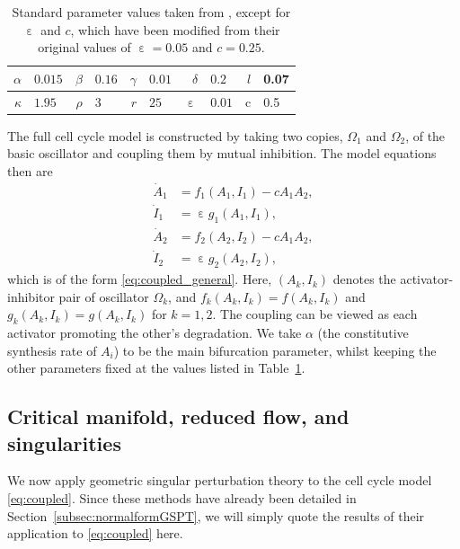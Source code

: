 \documentclass[10pt,onecolumn]{article}
\theoremstyle{plain}
\DeclareMathOperator{\eps}{\varepsilon}
\begin{document}
\begin{table}[h]
   \centering
   \begin{tabular}{|r|l|r|l|r|l|r|l|r|l|} 
   \hline
   $\alpha$ & $0.015$ & $\beta$ & $0.16$ & $\gamma$ & $0.01$ & $\delta$ & $0.2$ & $l$ & 0.07 \\ 
   \hline
   $\kappa$ & $1.95$ & $\rho$ & $3$ & $r$ & $25$ & $\eps$ & $0.01$ & {c} & {0.5} \\ 
   \hline
   \end{tabular}
   \caption{Standard parameter values taken from \cite{Dragoi2024}, except for $\eps$ and $c$, which have been modified from their original values of $\eps = 0.05$ and $c=0.25$.}
   \label{tab:params}
\end{table}

The full cell cycle model is constructed by taking two copies, $\Omega_1$ and $\Omega_2$, of the basic oscillator and coupling them by mutual inhibition. 
The model equations then are
%
\begin{equation} \label{eq:coupled}
  \begin{split}
    \dot{A}_1 &=  f_1(A_1,I_1) - c A_1 A_2, \\ 
    \dot{I}_1 &= \eps g_1(A_1,I_1), \\
    \dot{A}_2 &= f_2(A_2,I_2) - c A_1 A_2, \\ 
    \dot{I}_2 &= \eps g_2(A_2,I_2), 
  \end{split}
\end{equation}
%
which is of the form \eqref{eq:coupled_general}. 
Here, $(A_k,I_k)$ denotes the activator-inhibitor pair of oscillator $\Omega_k$, and $f_k(A_k,I_k) = f(A_k,I_k)$ and $g_k(A_k,I_k) = g(A_k,I_k)$ for $k=1,2$.  
The coupling can be viewed as each activator promoting the other's degradation. 
We take $\alpha$ (the constitutive synthesis rate of $A_i$) to be the main bifurcation parameter, whilst keeping the other parameters fixed at the values listed in Table~\ref{tab:params}.

\subsection{Critical manifold, reduced flow, and singularities} \label{subsec:modelS}
We now apply geometric singular perturbation theory to the cell cycle model \eqref{eq:coupled}. 
Since these methods have already been detailed in Section~\ref{subsec:normalformGSPT}, we will simply quote the results of their application to \eqref{eq:coupled} here.
\end{document}
